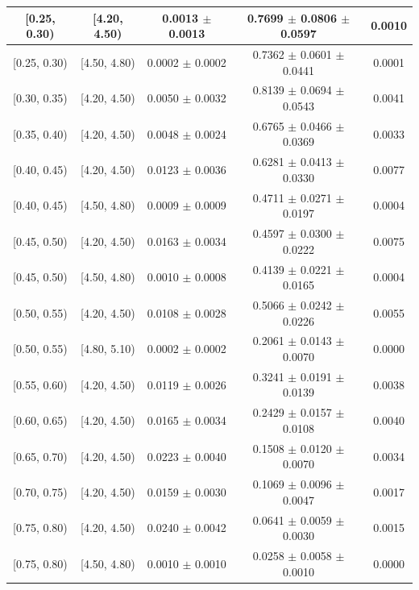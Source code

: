 \begin{longtable}{|c|c|c|c|c|}
\hline
\endlastfoot
[0.25, 0.30) & [4.20, 4.50) & 0.0013 $\pm$ 0.0013 & 0.7699 $\pm$ 0.0806 $\pm$ 0.0597 & 0.0010 \\ 
\hline
[0.25, 0.30) & [4.50, 4.80) & 0.0002 $\pm$ 0.0002 & 0.7362 $\pm$ 0.0601 $\pm$ 0.0441 & 0.0001 \\ 
\hline
[0.30, 0.35) & [4.20, 4.50) & 0.0050 $\pm$ 0.0032 & 0.8139 $\pm$ 0.0694 $\pm$ 0.0543 & 0.0041 \\ 
\hline
[0.35, 0.40) & [4.20, 4.50) & 0.0048 $\pm$ 0.0024 & 0.6765 $\pm$ 0.0466 $\pm$ 0.0369 & 0.0033 \\ 
\hline
[0.40, 0.45) & [4.20, 4.50) & 0.0123 $\pm$ 0.0036 & 0.6281 $\pm$ 0.0413 $\pm$ 0.0330 & 0.0077 \\ 
\hline
[0.40, 0.45) & [4.50, 4.80) & 0.0009 $\pm$ 0.0009 & 0.4711 $\pm$ 0.0271 $\pm$ 0.0197 & 0.0004 \\ 
\hline
[0.45, 0.50) & [4.20, 4.50) & 0.0163 $\pm$ 0.0034 & 0.4597 $\pm$ 0.0300 $\pm$ 0.0222 & 0.0075 \\ 
\hline
[0.45, 0.50) & [4.50, 4.80) & 0.0010 $\pm$ 0.0008 & 0.4139 $\pm$ 0.0221 $\pm$ 0.0165 & 0.0004 \\ 
\hline
[0.50, 0.55) & [4.20, 4.50) & 0.0108 $\pm$ 0.0028 & 0.5066 $\pm$ 0.0242 $\pm$ 0.0226 & 0.0055 \\ 
\hline
[0.50, 0.55) & [4.80, 5.10) & 0.0002 $\pm$ 0.0002 & 0.2061 $\pm$ 0.0143 $\pm$ 0.0070 & 0.0000 \\ 
\hline
[0.55, 0.60) & [4.20, 4.50) & 0.0119 $\pm$ 0.0026 & 0.3241 $\pm$ 0.0191 $\pm$ 0.0139 & 0.0038 \\ 
\hline
[0.60, 0.65) & [4.20, 4.50) & 0.0165 $\pm$ 0.0034 & 0.2429 $\pm$ 0.0157 $\pm$ 0.0108 & 0.0040 \\ 
\hline
[0.65, 0.70) & [4.20, 4.50) & 0.0223 $\pm$ 0.0040 & 0.1508 $\pm$ 0.0120 $\pm$ 0.0070 & 0.0034 \\ 
\hline
[0.70, 0.75) & [4.20, 4.50) & 0.0159 $\pm$ 0.0030 & 0.1069 $\pm$ 0.0096 $\pm$ 0.0047 & 0.0017 \\ 
\hline
[0.75, 0.80) & [4.20, 4.50) & 0.0240 $\pm$ 0.0042 & 0.0641 $\pm$ 0.0059 $\pm$ 0.0030 & 0.0015 \\ 
\hline
[0.75, 0.80) & [4.50, 4.80) & 0.0010 $\pm$ 0.0010 & 0.0258 $\pm$ 0.0058 $\pm$ 0.0010 & 0.0000 \\ 
\hline
\end{longtable}
